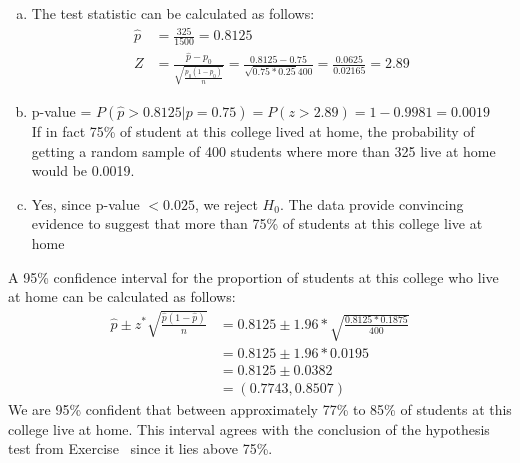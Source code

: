 {{{\begin{enumerate}[(a)]
\begin{enumerate}[1.]
\begin{align*}
np &\ge 10 \rightarrow 400 * 0.75 = 300 > 10 \checkmark \\
n(1 - p) &\ge 10 \rightarrow 400 * 0.25 = 100 > 10 \checkmark
\end{align*}
Since the observations are independent and the success-failure condition is met, we can assume that $\hat{p}$ is nearly normal.
\end{enumerate}
\item The test statistic can be calculated as follows:
\begin{align*}
\hat{p} &= \frac{325}{1500} = 0.8125 \\
Z &= \frac{\hat{p} - p_0}{\sqrt{\frac{p_0 (1 - p_0)}{n}}} = \frac{0.8125 - 0.75}{\sqrt{0.75 * 0.25}{400}} = \frac{0.0625}{0.02165} = 2.89
\end{align*}
\item p-value = $P(\hat{p} > 0.8125 | p = 0.75) = P(z > 2.89) = 1 - 0.9981 = 0.0019 $ \\
$\:$ \\
If in fact 75\% of student at this college lived at home, the probability of getting a random sample of 400 students where more than 325 live at home would be 0.0019.
\item Yes, since p-value $< 0.025$, we reject $H_0$. The data provide convincing evidence to suggest that more than 75\% of students at this college live at home
\end{enumerate}
}\label{collegeStuLiveAtHome}
}}

%

{
{
A 95\% confidence interval for the proportion of students at this college who live at home can be calculated as follows:
\begin{align*}
\hat{p} \pm z^* \sqrt{\frac{\hat{p} (1 - \hat{p})}{n}} &= 0.8125 \pm 1.96 * \sqrt{\frac{0.8125* 0.1875}{400}} \\
&= 0.8125 \pm 1.96 * 0.0195 \\
&= 0.8125 \pm 0.0382 \\
&= (0.7743 , 0.8507)
\end{align*}
We are 95\% confident that between approximately 77\% to 85\% of students at this college live at home. This interval agrees with the conclusion of the hypothesis test from Exercise~ since it lies above 75\%.
}
}

